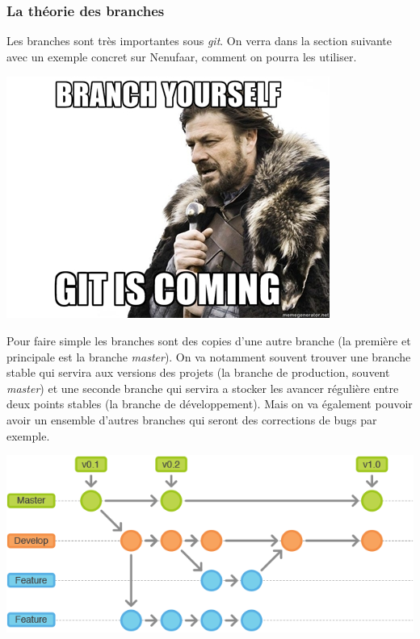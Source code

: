 \documentclass[12pt,a4paper]{article}
\begin{document}
\subsubsection{La théorie des branches}

\begin{minipage}{0.7\linewidth}
Les branches sont très importantes sous \emph{git}. On verra dans la section suivante avec un exemple concret sur Nenufaar, comment on pourra les utiliser.
\end{minipage}\hfill
\begin{minipage}{0.25\linewidth}
\includegraphics[width=\linewidth]{branch}
\end{minipage}

Pour faire simple les branches sont des copies d'une autre branche (la première et principale est la branche \emph{master}). On va notamment souvent trouver une branche stable qui servira aux versions des projets (la branche de production, souvent \emph{master}) et une seconde branche qui servira a stocker les avancer régulière entre deux points stables (la branche de développement). Mais on va également pouvoir avoir un ensemble d'autres branches qui seront des corrections de bugs par exemple.

\centerline{
\includegraphics[width=0.7\linewidth]{git-branch}}
\end{document}
